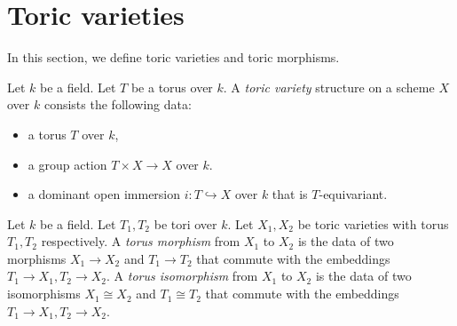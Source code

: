 \section{Toric varieties}


In this section, we define toric varieties and toric morphisms.


\begin{definition}
  \label{5-1-tor-var}
  \leanok

  Let $k$ be a field.
  Let $T$ be a torus over $k$.
  A \emph{toric variety} structure on a scheme $X$ over $k$ consists the following data:
  \begin{itemize}
    \item a torus $T$ over $k$,
    \item a group action $T \times X \to X$ over $k$.
    \item a dominant open immersion $i : T \hookrightarrow X$ over $k$ that is $T$-equivariant.
  \end{itemize}
\end{definition}


\begin{definition}
  \label{5-1-tor-hom}
  \leanok

  Let $k$ be a field.
  Let $T_1, T_2$ be tori over $k$.
  Let $X_1, X_2$ be toric varieties with torus $T_1, T_2$ respectively.
  A \emph{torus morphism} from $X_1$ to $X_2$ is the data of two morphisms $X_1 \to X_2$ and
  $T_1 \to T_2$ that commute with the embeddings $T_1 \to X_1, T_2 \to X_2$.
  A \emph{torus isomorphism} from $X_1$ to $X_2$ is the data of two isomorphisms $X_1 \cong X_2$ and
  $T_1 \cong T_2$ that commute with the embeddings $T_1 \to X_1, T_2 \to X_2$.
\end{definition}

